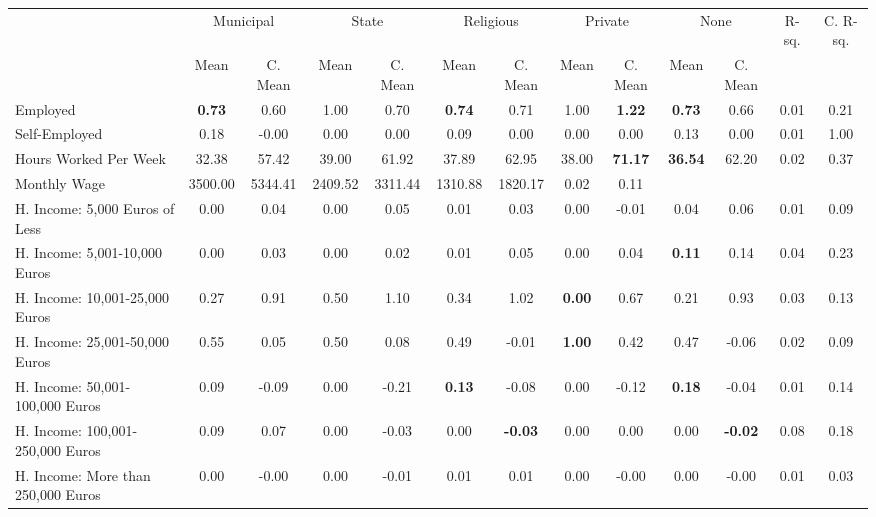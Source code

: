 \begin{tabular}{l c c c c c c c c c c c c}
\toprule
& \multicolumn{2}{c}{Municipal} & \multicolumn{2}{c}{State} & \multicolumn{2}{c}{Religious} & \multicolumn{2}{c}{Private} & \multicolumn{2}{c}{None} & R-sq. & C. R-sq. \\
& \scriptsize Mean & \scriptsize C. Mean & \scriptsize Mean & \scriptsize C. Mean & \scriptsize Mean & \scriptsize C. Mean & \scriptsize Mean & \scriptsize C. Mean & \scriptsize Mean & \scriptsize C. Mean & & \\
\midrule
Employed & \textbf{     0.73} & 0.60 &      1.00 & 0.70 & \textbf{     0.74} & 0.71 &      1.00 & \textbf{     1.22} & \textbf{     0.73} & 0.66 &      0.01 &      0.21 \\
Self-Employed &      0.18 & -0.00 &      0.00 & 0.00 &      0.09 & 0.00 &      0.00 & 0.00 &      0.13 & 0.00 &      0.01 &      1.00 \\
Hours Worked Per Week &     32.38 & 57.42 &     39.00 & 61.92 &     37.89 & 62.95 &     38.00 & \textbf{    71.17} & \textbf{    36.54} & 62.20 &      0.02 &      0.37 \\
Monthly Wage &   3500.00 & 5344.41 &   2409.52 & 3311.44 &   1310.88 & 1820.17 &      0.02 &      0.11 \\
H. Income: 5,000 Euros of Less &      0.00 & 0.04 &      0.00 & 0.05 &      0.01 & 0.03 &      0.00 & -0.01 &      0.04 & 0.06 &      0.01 &      0.09 \\
H. Income: 5,001-10,000 Euros &      0.00 & 0.03 &      0.00 & 0.02 &      0.01 & 0.05 &      0.00 & 0.04 & \textbf{     0.11} & 0.14 &      0.04 &      0.23 \\
H. Income: 10,001-25,000 Euros &      0.27 & 0.91 &      0.50 & 1.10 &      0.34 & 1.02 & \textbf{     0.00} & 0.67 &      0.21 & 0.93 &      0.03 &      0.13 \\
H. Income: 25,001-50,000 Euros &      0.55 & 0.05 &      0.50 & 0.08 &      0.49 & -0.01 & \textbf{     1.00} & 0.42 &      0.47 & -0.06 &      0.02 &      0.09 \\
H. Income: 50,001-100,000 Euros &      0.09 & -0.09 &      0.00 & -0.21 & \textbf{     0.13} & -0.08 &      0.00 & -0.12 & \textbf{     0.18} & -0.04 &      0.01 &      0.14 \\
H. Income: 100,001-250,000 Euros &      0.09 & 0.07 &      0.00 & -0.03 &      0.00 & \textbf{    -0.03} &      0.00 & 0.00 &      0.00 & \textbf{    -0.02} &      0.08 &      0.18 \\
H. Income: More than 250,000 Euros &      0.00 & -0.00 &      0.00 & -0.01 &      0.01 & 0.01 &      0.00 & -0.00 &      0.00 & -0.00 &      0.01 &      0.03 \\
\bottomrule
\end{tabular}
